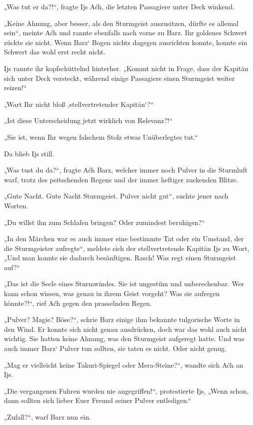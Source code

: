 „Was tut er da?!“, fragte Ijs Aćh, die letzten Passagiere unter Deck winkend.

„Keine Ahnung, aber besser, als den Sturmgeist auszusitzen, dürfte es allemal sein“, meinte Aćh und rannte ebenfalls nach vorne zu Barz. Ihr goldenes Schwert zückte sie nicht. Wenn Barz‘ Bogen nichts dagegen ausrichten konnte, konnte ein Schwert das wohl erst recht nicht.

Ijs rannte ihr kopfschüttelnd hinterher. „Kommt nicht in Frage, dass der Kapitän sich unter Deck versteckt, während einige Passagiere einen Sturmgeist weiter reizen!“

„Wart Ihr nicht bloß ‚stellvertretender Kapitän‘?“

„Ist diese Unterscheidung jetzt wirklich von Relevanz?!“

„Sie ist, wenn Ihr wegen falschem Stolz etwas Unüberlegtes tut.“

Da blieb Ijs still.

„Was tust du da?“, fragte Aćh Barz, welcher immer noch Pulver in die Sturmluft warf, trotz des peitschenden Regens und der immer heftiger zuckenden Blitze.

„Gute Nacht. Gute Nacht Sturmgeist. Pulver nicht gut“, suchte jener nach Worten.

„Du willst ihn zum Schlafen bringen? Oder zumindest beruhigen?“

„In den Märchen war es auch immer eine bestimmte Tat oder ein Umstand, der die Sturmgeister aufregte“, meldete sich der stellvertretende Kapitän Ijs zu Wort, „Und man konnte sie dadurch besänftigen. Rasch! Was regt einen Sturmgeist auf?“

„Das ist die Seele eines Sturmwindes. Sie ist ungestüm und unberechenbar. Wer kann schon wissen, was genau in ihrem Geist vorgeht? Was sie aufregen könnte?!“, rief Aćh gegen den prasselnden Regen.

„Pulver? Magie? Böse?“, schrie Barz einige ihm bekannte tulgorische Worte in den Wind. Er konnte sich nicht genau ausdrücken, doch war das wohl auch nicht wichtig. Sie hatten keine Ahnung, was den Sturmgeist aufgeregt hatte. Und was auch immer Barz‘ Pulver tun sollten, sie taten es nicht. Oder nicht genug.

„Mag er vielleicht keine Takuri-Spiegel oder Mera-Steine?“, wandte sich Aćh an Ijs.

„Die vergangenen Fuhren wurden nie angegriffen!“, protestierte Ijs, „Wenn schon, dann sollten sich lieber Euer Freund seiner Pulver entledigen.“

„Zufall?“, warf Barz nun ein.

